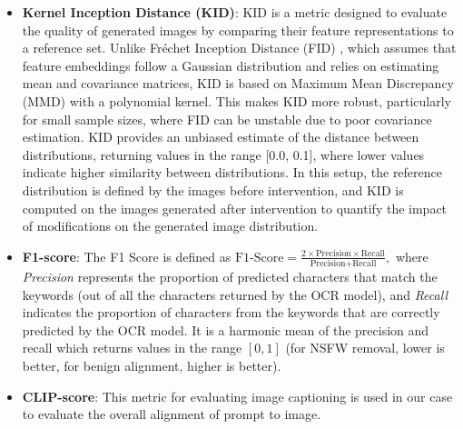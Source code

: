 \begin{itemize}
    \item \textbf{Kernel Inception Distance (KID)}:
    KID \cite{KID} is a metric designed to evaluate the quality of generated images by comparing their feature representations to a reference set. Unlike Fréchet Inception Distance (FID) \cite{FID}, which assumes that feature embeddings follow a Gaussian distribution and relies on estimating mean and covariance matrices, KID is based on Maximum Mean Discrepancy (MMD) with a polynomial kernel. This makes KID more robust, particularly for small sample sizes, where FID can be unstable due to poor covariance estimation. KID provides an unbiased estimate of the distance between distributions, returning values in the range [0.0, 0.1], where lower values indicate higher similarity between distributions. In this setup, the reference distribution is defined by the images before intervention, and KID is computed on the images generated after intervention to quantify the impact of modifications on the generated image distribution.
    \item \textbf{F1-score}:   
The F1 Score is defined as
$
    \text{F1-Score} = \frac{2 \times \text{Precision} \times \text{Recall}}{\text{Precision} + \text{Recall}},
$
where \textit{Precision} represents the proportion of predicted characters that match the keywords (out of all the characters returned by the OCR model), and \textit{Recall} indicates the proportion of characters from the keywords that are correctly predicted by the OCR model. It is a harmonic mean of the precision and recall which returns values in the range $[0,1]$ (for NSFW removal, lower is better, for benign alignment, higher is better).

\item \textbf{CLIP-score}: This metric for evaluating image captioning is used in our case to evaluate the overall alignment of prompt to image. 


\end{itemize}
